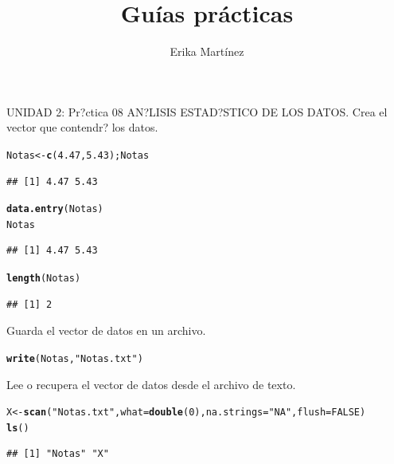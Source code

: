 \documentclass[10pt,a4paper]{article}\usepackage[]{graphicx}\usepackage[]{color}
\author{Erika Martínez}
\title{Guías prácticas}
\makeatletter
\newcommand{\hlnum}[1]{\textcolor[rgb]{0.686,0.059,0.569}{#1}}%
\newcommand{\hlstr}[1]{\textcolor[rgb]{0.192,0.494,0.8}{#1}}%
\newcommand{\hlstd}[1]{\textcolor[rgb]{0.345,0.345,0.345}{#1}}%
\newcommand{\hlkwb}[1]{\textcolor[rgb]{0.69,0.353,0.396}{#1}}%
\newcommand{\hlkwc}[1]{\textcolor[rgb]{0.333,0.667,0.333}{#1}}%
\newcommand{\hlkwd}[1]{\textcolor[rgb]{0.737,0.353,0.396}{\textbf{#1}}}%
\newenvironment{kframe}{%
 \def\at@end@of@kframe{}%
 \ifinner\ifhmode%
  \def\at@end@of@kframe{\end{minipage}}%
  \begin{minipage}{\columnwidth}%
 \fi\fi%
 \def\FrameCommand##1{\hskip\@totalleftmargin \hskip-\fboxsep
 \colorbox{shadecolor}{##1}\hskip-\fboxsep
     \hskip-\linewidth \hskip-\@totalleftmargin \hskip\columnwidth}%
 \MakeFramed {\advance\hsize-\width
   \@totalleftmargin\z@ \linewidth\hsize
   \@setminipage}}%
 {\par\unskip\endMakeFramed%
 \at@end@of@kframe}
\newenvironment{knitrout}{}{} %
\makeatother
\begin{document}
\maketitle
\newpage

UNIDAD 2: Pr?ctica 08 AN?LISIS ESTAD?STICO DE LOS DATOS. 
Crea el vector que contendr? los datos. 
\begin{knitrout}
\color{fgcolor}\begin{kframe}
\begin{alltt}
\hlstd{Notas} \hlkwb{<-} \hlkwd{c}\hlstd{(}\hlnum{4.47}\hlstd{,} \hlnum{5.43}\hlstd{); Notas}
\end{alltt}
\begin{verbatim}
## [1] 4.47 5.43
\end{verbatim}
\begin{alltt}
\hlkwd{data.entry}\hlstd{(Notas)}
\hlstd{Notas}
\end{alltt}
\begin{verbatim}
## [1] 4.47 5.43
\end{verbatim}
\begin{alltt}
\hlkwd{length}\hlstd{(Notas)}
\end{alltt}
\begin{verbatim}
## [1] 2
\end{verbatim}
\end{kframe}
\end{knitrout}

Guarda el vector de datos en un archivo. 
\begin{knitrout}
\color{fgcolor}\begin{kframe}
\begin{alltt}
\hlkwd{write}\hlstd{(Notas,} \hlstr{"Notas.txt"}\hlstd{)}
\end{alltt}
\end{kframe}
\end{knitrout}

Lee o recupera el vector de datos desde el archivo de texto. 
\begin{knitrout}
\color{fgcolor}\begin{kframe}
\begin{alltt}
\hlstd{X} \hlkwb{<-} \hlkwd{scan}\hlstd{(}\hlstr{"Notas.txt"}\hlstd{,} \hlkwc{what} \hlstd{=} \hlkwd{double}\hlstd{(}\hlnum{0}\hlstd{),} \hlkwc{na.strings} \hlstd{=} \hlstr{"NA"}\hlstd{,} \hlkwc{flush}\hlstd{=}\hlnum{FALSE}\hlstd{)}
\hlkwd{ls}\hlstd{()}
\end{alltt}
\begin{verbatim}
## [1] "Notas" "X"
\end{verbatim}
\end{kframe}
\end{knitrout}
\end{document}
